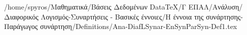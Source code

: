 /home/spyros/Μαθηματικά/Βάσεις Δεδομένων DataTeX/Γ ΕΠΑΛ/Ανάλυση/Διαφορικός Λογισμός-Συναρτήσεις - Βασικές έννοιες/Η έννοια της συνάρτησης-Παράγωγος συνάρτηση/Definitions/Ana-DiafLSynar-EnSynParSyn-Def1.tex